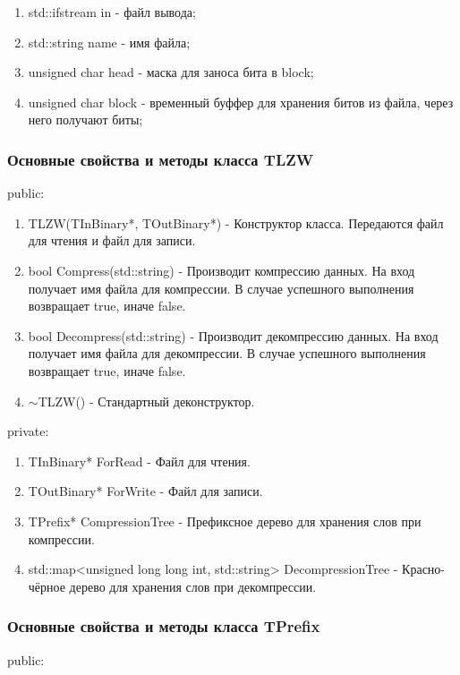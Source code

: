 \documentclass[12pt]{article}
\begin{document}
	\begin{enumerate}
		\item std::ifstream in - файл вывода;
		\item std::string name - имя файла;
		\item unsigned char head - маска для заноса бита в block;
		\item unsigned char block - временный буффер для хранения битов из файла, через него получают биты;
	\end{enumerate}
	
	\subsubsection*{Основные свойства и методы класса TLZW}
	\noindent
	public:
	
	\begin{enumerate}
		\item TLZW(TInBinary*, TOutBinary*) - Конструктор класса. Передаются файл для чтения и файл для записи.
		\item bool Compress(std::string) - Производит компрессию данных. На вход получает имя файла для компрессии. В случае успешного выполнения возвращает true, иначе false.
		\item bool Decompress(std::string) - Производит декомпрессию данных. На вход получает имя файла для декомпрессии. В случае успешного выполнения возвращает true, иначе false.
		\item $\sim$TLZW() - Стандартный деконструктор.
	\end{enumerate}
	\noindent
	private:
	
	\begin{enumerate}
		\item TInBinary* ForRead - Файл для чтения.
		\item TOutBinary* ForWrite - Файл для записи.
		\item TPrefix* CompressionTree - Префиксное дерево для хранения слов при компрессии.
		\item std::map<unsigned long long int, std::string> DecompressionTree - Красно-чёрное дерево для хранения слов при декомпрессии.
	\end{enumerate}
	
	\subsubsection*{Основные свойства и методы класса TPrefix}
	
	\noindent
	public:
	
\end{document}
